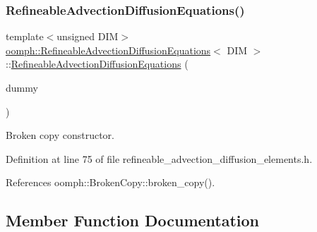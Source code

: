 \subsubsection{\texorpdfstring{Refineable\+Advection\+Diffusion\+Equations()}{RefineableAdvectionDiffusionEquations()}\hspace{0.1cm}{\footnotesize\ttfamily [2/2]}}
{\footnotesize\ttfamily template$<$unsigned D\+IM$>$ \\
\hyperlink{classoomph_1_1RefineableAdvectionDiffusionEquations}{oomph\+::\+Refineable\+Advection\+Diffusion\+Equations}$<$ D\+IM $>$\+::\hyperlink{classoomph_1_1RefineableAdvectionDiffusionEquations}{Refineable\+Advection\+Diffusion\+Equations} (\begin{DoxyParamCaption}\item[{const \hyperlink{classoomph_1_1RefineableAdvectionDiffusionEquations}{Refineable\+Advection\+Diffusion\+Equations}$<$ D\+IM $>$ \&}]{dummy }\end{DoxyParamCaption})\hspace{0.3cm}{\ttfamily [inline]}}



Broken copy constructor. 



Definition at line 75 of file refineable\+\_\+advection\+\_\+diffusion\+\_\+elements.\+h.



References oomph\+::\+Broken\+Copy\+::broken\+\_\+copy().



\subsection{Member Function Documentation}
\mbox{\label{classoomph_1_1RefineableAdvectionDiffusionEquations_abebbab739a9f15f659ad6039499c7e59}} 

